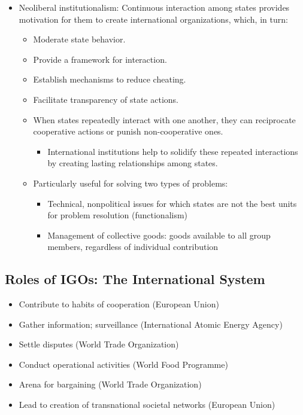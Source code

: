 \documentclass[
]{book}
\providecommand{\tightlist}{%
  \setlength{\itemsep}{0pt}\setlength{\parskip}{0pt}}
\begin{document}
\begin{itemize}
\item
  Neoliberal institutionalism: Continuous interaction among states provides motivation for them to create international organizations, which, in turn:

  \begin{itemize}
  \item
    Moderate state behavior.
  \item
    Provide a framework for interaction.
  \item
    Establish mechanisms to reduce cheating.
  \item
    Facilitate transparency of state actions.
  \item
    When states repeatedly interact with one another, they can reciprocate cooperative actions or punish non-cooperative ones.

    \begin{itemize}
    \tightlist
    \item
      International institutions help to solidify these repeated interactions by creating lasting relationships among states.
    \end{itemize}
  \item
    Particularly useful for solving two types of problems:

    \begin{itemize}
    \item
      Technical, nonpolitical issues for which states are not the best units for problem resolution (functionalism)
    \item
      Management of collective goods: goods available to all group members, regardless of individual contribution
    \end{itemize}
  \end{itemize}
\end{itemize}

\hypertarget{roles-of-igos-the-international-system}{%
\subsection{Roles of IGOs: The International System}\label{roles-of-igos-the-international-system}}

\begin{itemize}
\item
  Contribute to habits of cooperation (European Union)
\item
  Gather information; surveillance (International Atomic Energy Agency)
\item
  Settle disputes (World Trade Organization)
\item
  Conduct operational activities (World Food Programme)
\item
  Arena for bargaining (World Trade Organization)
\item
  Lead to creation of transnational societal networks (European Union)
\end{itemize}
\end{document}
